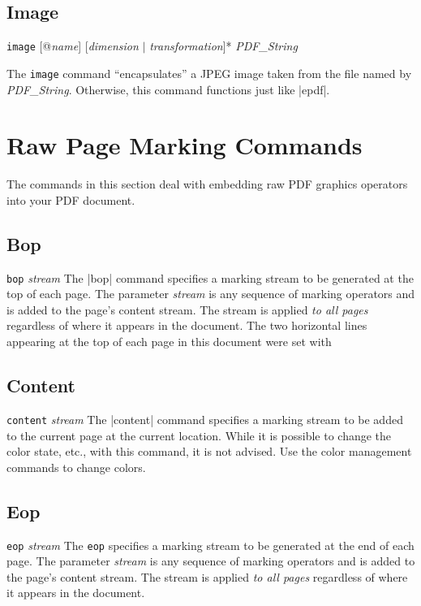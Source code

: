 {\subsection{Image}
\syntax
{\tt image} [@{\it name}] [{\it dimension} $\vert$ {\it transformation}]*  {\it PDF\_String}

\description
The {\tt image} command ``encapsulates'' a JPEG image
taken from the file named by {\it PDF\_String}.
Otherwise, this command functions just like |epdf|.

\section{Raw Page Marking Commands}
The commands in this section deal with embedding
raw PDF graphics operators into your PDF document.

\subsection{Bop}
\syntax
{\tt bop} {\it stream}
\description
The |bop| command specifies a marking
stream to be generated at the top of each page.
The parameter {\it stream} is any sequence
of marking operators and is added to the page's content stream.  
The stream is applied {\it to all pages} regardless
of where it appears in the document.
\example  The two horizontal lines appearing
at the top of each page in this document
were set with
\begintt
{}
\endtt
{}

\subsection{Content}
\syntax
{\tt content} {\it stream}
\description
The |content| command specifies a marking
stream to be added to the current page at
the current location.  While it
is possible to change the color
state, etc., with this command, it is
not advised.  Use the color management
commands to change colors.


\subsection{Eop}
\syntax
\beginlist
{\tt eop} {\it stream}
\endlist
\description
The {\tt eop} specifies a marking stream to be generated at the end
of each page. The parameter {\it stream} is any sequence
of marking operators and is added to the page's content stream.  
The stream is applied {\it to all pages} regardless
of where it appears in the document.

}
